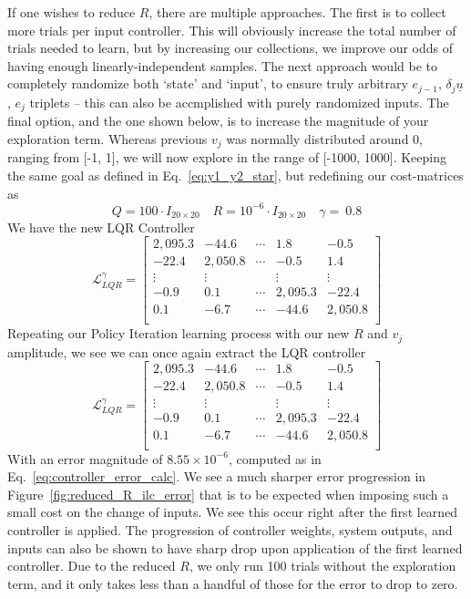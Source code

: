 If one wishes to reduce $R$, there are multiple approaches. The first is to collect more trials per input controller. This will obviously increase the total number of trials needed to learn, but by increasing our collections, we improve our odds of having enough linearly-independent samples. The next approach would be to completely randomize both `state' and `input', to ensure truly arbitrary $e_{j-1}$, $\delta_j\underline{u}$, $e_j$ triplets -- this can also be accmplished with purely randomized inputs. The final option, and the one shown below, is to increase the magnitude of your exploration term.
Whereas previous $v_j$ was normally distributed around 0, ranging from [-1, 1], we will now explore in the range of [-1000, 1000]. Keeping the same goal as defined in Eq.~\ref{eq:y1_y2_star}, but redefining our cost-matrices as
\begin{equation}
    Q=100\cdot I_{20 \times 20}
    \quad
    R={10}^{-6}\cdot I_{20 \times 20}
    \quad
    \gamma=\ 0.8
\end{equation}
We have the new LQR Controller
\begin{equation}
    \mathcal{L}_{LQR}^\gamma=\left[\begin{matrix}2,095.3&-44.6&\cdots&1.8&-0.5\\-22.4&2,050.8&\cdots&-0.5&1.4\\\vdots&\vdots&&\vdots&\vdots\\-0.9&0.1&\cdots&2,095.3&-22.4\\0.1&-6.7&\cdots&-44.6&2,050.8\\\end{matrix}\right]
    \label{eq:rl_ilc_lqr_small_R_controller}
\end{equation}
Repeating our Policy Iteration learning process with our new $R$ and $v_j$ amplitude, we see we can once again extract the LQR controller
\begin{equation}
    \mathcal{L}_{LQR}^\gamma=\left[\begin{matrix}2,095.3&-44.6&\cdots&1.8&-0.5\\-22.4&2,050.8&\cdots&-0.5&1.4\\\vdots&\vdots&&\vdots&\vdots\\-0.9&0.1&\cdots&2,095.3&-22.4\\0.1&-6.7&\cdots&-44.6&2,050.8\\\end{matrix}\right]
    \label{eq:rl_ilc_policy_small_R_controller}
\end{equation}
With an error magnitude of $8.55\times{10}^{-6}$, computed as in Eq.~\ref{eq:controller_error_calc}. We see a much sharper error progression in Figure~\ref{fig:reduced_R_ilc_error} that is to be expected when imposing such a small cost on the change of inputs. We see this occur right after the first learned controller is applied. The progression of controller weights, system outputs, and inputs can also be shown to have sharp drop upon application of the first learned controller. Due to the reduced $R$, we only run 100 trials without the exploration term, and it only takes less than a handful of those for the error to drop to zero.

